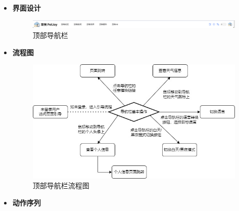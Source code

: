 \begin{itemize}
	
	\item \textbf{界面设计}

	\begin{figure}[H]
		\centering
		\includegraphics[scale=0.8]{figures/TopNavigationBar1.png} 
		\caption{顶部导航栏}
	\end{figure}

	\item \textbf{流程图}

	\begin{figure}[H]
		\centering
		\includegraphics[scale=0.5]{figures/TopNavigationBar13.jpg} 
		\caption{顶部导航栏流程图}
	\end{figure}

	\item \textbf{动作序列}


\end{itemize}
